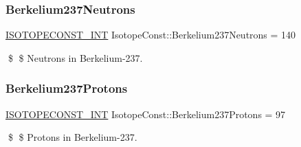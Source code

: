 \subsubsection{\texorpdfstring{Berkelium237\+Neutrons}{Berkelium237Neutrons}}
{\footnotesize\ttfamily \mbox{\hyperlink{group___isotope_const-_macros_ga5f18360b3e99483a35c32d789e62621c}{I\+S\+O\+T\+O\+P\+E\+C\+O\+N\+S\+T\+\_\+\+I\+NT}} Isotope\+Const\+::\+Berkelium237\+Neutrons = 140}

\$ \$ Neutrons in Berkelium-\/237. \mbox{\label{group___isotope_const-_berkelium-_bk237_ga036c18d60d24a4ad4eab319d7913ff23}} 
\subsubsection{\texorpdfstring{Berkelium237\+Protons}{Berkelium237Protons}}
{\footnotesize\ttfamily \mbox{\hyperlink{group___isotope_const-_macros_ga5f18360b3e99483a35c32d789e62621c}{I\+S\+O\+T\+O\+P\+E\+C\+O\+N\+S\+T\+\_\+\+I\+NT}} Isotope\+Const\+::\+Berkelium237\+Protons = 97}

\$ \$ Protons in Berkelium-\/237. 